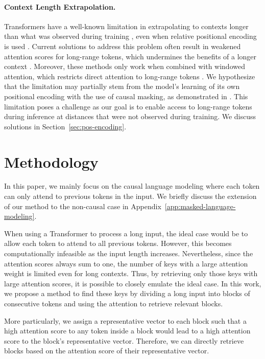 \paragraph{Context Length Extrapolation.} Transformers have a well-known limitation in extrapolating to contexts longer than what was observed during training \cite{press_train_2022}, even when relative positional encoding is used \cite{sun_length-extrapolatable_2022}. Current solutions to address this problem often result in weakened attention scores for long-range tokens, which undermines the benefits of a longer context \cite{press_train_2022,sun_length-extrapolatable_2022}. Moreover, these methods only work when combined with windowed attention, which restricts direct attention to long-range tokens \cite{sun_length-extrapolatable_2022}. We hypothesize that the limitation may partially stem from the model's learning of its own positional encoding with the use of causal masking, as demonstrated in \cite{haviv_transformer_2022}. This limitation poses a challenge as our goal is to enable access to long-range tokens during inference at distances that were not observed during training. We discuss solutions in Section~\ref{sec:pos-encoding}. 

\section{Methodology}
In this paper, we mainly focus on the causal language modeling where each token can only attend to previous tokens in the input. We briefly discuss the extension of our method to the non-causal case in Appendix~\ref{app:masked-language-modeling}. 

When using a Transformer to process a long input, the ideal case would be to allow each token to attend to all previous tokens. However, this becomes computationally infeasible as the input length increases. Nevertheless, since the attention scores always sum to one, the number of keys with a large attention weight is limited even for long contexts. Thus, by retrieving only those keys with large attention scores, it is possible to closely emulate the ideal case. In this work, we propose a method to find these keys by dividing a long input into blocks of consecutive tokens and using the attention to retrieve relevant blocks. 

More particularly, we assign a representative vector to each block such that a high attention score to any token inside a block would lead to a high attention score to the block's representative vector. Therefore, we can directly retrieve blocks based on the attention score of their representative vector. 

